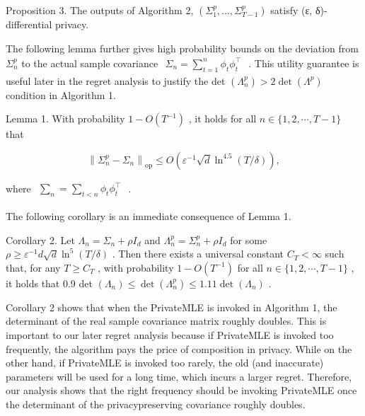 Proposition 3. The outputs of Algorithm 2, \(\left( \Sigma _ { 1 } ^ { p } , \dots , \Sigma _ { T - 1 } ^ { p } \right)\) satisfy (ε, δ)-differential privacy.

The following lemma further gives high probability bounds on the deviation from \(\Sigma _ { n } ^ { p }\) to the actual sample covariance \(\begin{array} { r } { \Sigma _ { n } = \sum _ { t = 1 } ^ { n } \phi _ { t } \phi _ { t } ^ { \top } } \end{array}\) . This utility guarantee is useful later in the regret analysis to justify the det \(\left( \Lambda _ { n } ^ { p } \right) > 2 \operatorname* { d e t } ( \Lambda ^ { p } )\) condition in Algorithm 1.

Lemma 1. With probability \(1 - O ( T ^ { - 1 } )\) , it holds for all \(n \in \{ 1 , 2 , \cdots , T - 1 \}\) that

\[
\left\| \Sigma_ {n} ^ {p} - \Sigma_ {n} \right\| _ {\mathrm{op}} \leq O \left(\varepsilon^ {- 1} \sqrt {d} \ln^ {4. 5} (T / \delta)\right),
\]

where \(\begin{array} { r } { \sum _ { n } = \sum _ { t < n } \phi _ { t } \phi _ { t } ^ { \top } } \end{array}\) .

The following corollary is an immediate consequence of Lemma 1.

Corollary 2. Let \(\Lambda _ { n } = \Sigma _ { n } + \rho I _ { d }\) and \(\Lambda _ { n } ^ { p } = \Sigma _ { n } ^ { p } + \rho I _ { d }\) for some \(\rho \ge \varepsilon ^ { - 1 } d \sqrt { d } \ln ^ { 5 } ( T / \delta )\) . Then there exists a universal constant \(C _ { T } < \infty\) such that, for any \(T \geq C _ { T }\) , with probability \(1 - O ( T ^ { - 1 } )\) for all \(n \in \{ 1 , 2 , \cdots , T - 1 \}\) , it holds that 0.9 det \(\left( \Lambda _ { n } \right) \leq \operatorname* { d e t } ( \Lambda _ { n } ^ { p } ) \leq 1 . 1 1 \operatorname* { d e t } ( \Lambda _ { n } )\) .

Corollary 2 shows that when the PrivateMLE is invoked in Algorithm 1, the determinant of the real sample covariance matrix roughly doubles. This is important to our later regret analysis because if PrivateMLE is invoked too frequently, the algorithm pays the price of composition in privacy. While on the other hand, if PrivateMLE is invoked too rarely, the old (and inaccurate) parameters will be used for a long time, which incurs a larger regret. Therefore, our analysis shows that the right frequency should be invoking PrivateMLE once the determinant of the privacypreserving covariance roughly doubles.

